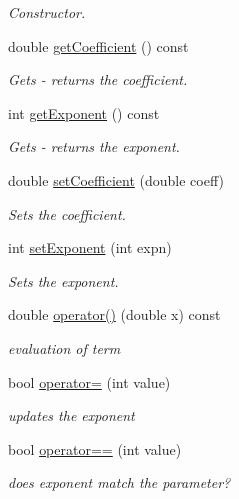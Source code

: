 \begin{DoxyCompactItemize}
\begin{DoxyCompactList}\small\item\em Constructor. \end{DoxyCompactList}\item 
double \hyperlink{classTerm_a155053b3506f434c6c788deb46b58eca}{get\-Coefficient} () const 
\begin{DoxyCompactList}\small\item\em Gets -\/ returns the coefficient. \end{DoxyCompactList}\item 
int \hyperlink{classTerm_a4366a4bde58427fde228da9f95505a78}{get\-Exponent} () const 
\begin{DoxyCompactList}\small\item\em Gets -\/ returns the exponent. \end{DoxyCompactList}\item 
double \hyperlink{classTerm_a2d062538a273b7c843f5ba9cd90f8029}{set\-Coefficient} (double coeff)
\begin{DoxyCompactList}\small\item\em Sets the coefficient. \end{DoxyCompactList}\item 
int \hyperlink{classTerm_a03d05f613d85b04c92baa1016abfa7cf}{set\-Exponent} (int expn)
\begin{DoxyCompactList}\small\item\em Sets the exponent. \end{DoxyCompactList}\item 
double \hyperlink{classTerm_ab89ea23f82711d4fc9f4608d0937ce31}{operator()} (double x) const 
\begin{DoxyCompactList}\small\item\em evaluation of term \end{DoxyCompactList}\item 
bool \hyperlink{classTerm_adde655c99c378021d03b25f02cd531b9}{operator=} (int value)
\begin{DoxyCompactList}\small\item\em updates the exponent \end{DoxyCompactList}\item 
bool \hyperlink{classTerm_a8e563a63ca972c9d2cffacb471a611a5}{operator==} (int value)
\begin{DoxyCompactList}\small\item\em does exponent match the parameter? \end{DoxyCompactList}\item 

\end{DoxyCompactItemize}
